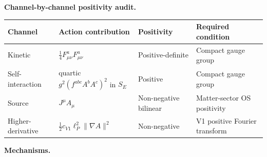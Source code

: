 \documentclass[
]{article}
\newcounter{none} %
\begin{document}
\textbf{Channel-by-channel positivity audit.}

{\def\LTcaptype{none} %
\begin{longtable}[]{@{}
  >{\raggedright\arraybackslash}p{}
  >{\raggedright\arraybackslash}p{}
  >{\raggedright\arraybackslash}p{}
  >{\raggedright\arraybackslash}p{}@{}}
\toprule\noalign{}
\begin{minipage}[b]{\linewidth}\raggedright
Channel
\end{minipage} & \begin{minipage}[b]{\linewidth}\raggedright
Action contribution
\end{minipage} & \begin{minipage}[b]{\linewidth}\raggedright
Positivity
\end{minipage} & \begin{minipage}[b]{\linewidth}\raggedright
Required condition
\end{minipage} \\
\midrule\noalign{}
\endhead
\bottomrule\noalign{}
\endlastfoot
Kinetic & \(\tfrac{1}{4}F_{\mu\nu}^a F_{\mu\nu}^a\) & Positive-definite
& Compact gauge group \\
Self-interaction & quartic \(g^2(f^{abc}A^bA^c)^2\) in \(S_E\) &
Positive & Compact gauge group \\
Source & \(J^\mu A_\mu\) & Non-negative bilinear & Matter-sector OS
positivity \\
Higher-derivative & \(\tfrac{1}{2}c_{V1}\ell_P^2\|\nabla A\|^2\) &
Non-negative & V1 positive Fourier transform \\
\end{longtable}
}

\textbf{Mechanisms.}
\end{document}

